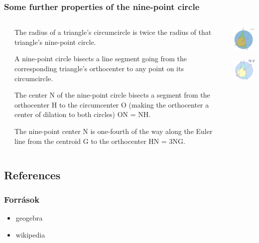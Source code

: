 \documentclass{beamer}
\begin{document}
	\begin{frame} 

        	\frametitle {Some further properties of the nine-point circle}
    

	 \begin{columns}
           	\begin{column}{0.5cm}
           	\end{column}
           	\begin{column}{9cm}

   			 {The radius of a triangle's circumcircle is twice the radius of that triangle's nine-point circle.} \par  
    \vspace{0.2cm}
     			 {A nine-point circle bisects a line segment going from the corresponding triangle's orthocenter to any point on its circumcircle.}
       
    \vspace{0.2cm}

    			 {The center N of the nine-point circle bisects a segment from the orthocenter H to the circumcenter O
				 (making the orthocenter a center of dilation to both circles)  ON = NH.} \par  

     			 {The nine-point center N is one-fourth of the way along the Euler line from the centroid G to the orthocenter
   					 HN = 3NG.}
	

           	\end{column}

           	\begin{column}{3.5cm}

    			 {\includegraphics[angle=5, width=3cm]{prop1.png}}

     			 {\includegraphics[angle=5, width=3cm]{prop2.png}}

   

           \end{column}
       
\end{columns}




	\end{frame}

\subsection{References}

	\begin{frame}
        	\frametitle{Források}
    			\begin{itemize}
        		\item geogebra
			\item wikipedia

     			\end{itemize}
	\end{frame}
\end{document}
